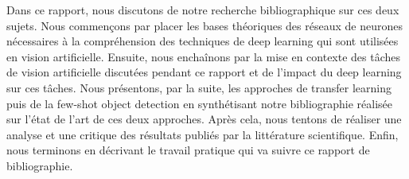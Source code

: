 Dans ce rapport, nous discutons de notre recherche bibliographique sur ces deux sujets. Nous commençons par placer les bases théoriques des réseaux de neurones nécessaires à la compréhension des techniques de deep learning qui sont utilisées en vision artificielle. Ensuite, nous enchaînons par la mise en contexte des tâches de vision artificielle discutées pendant ce rapport et de l'impact du deep learning sur ces tâches. Nous présentons, par la suite, les approches de transfer learning puis de la few-shot object detection en synthétisant notre bibliographie réalisée sur l'état de l'art de ces deux approches. Après cela, nous tentons de réaliser une analyse et une critique des résultats publiés par la littérature scientifique. Enfin, nous terminons en décrivant le travail pratique qui va suivre ce rapport de bibliographie.